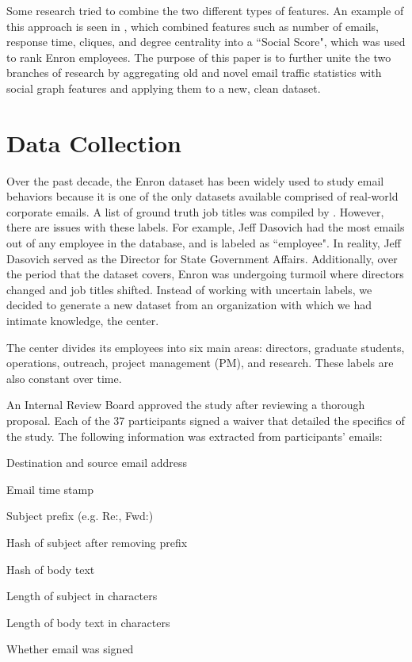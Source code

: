 \documentclass{article}
\begin{document}
\par
Some research tried to combine the two different types of features.  An example of this approach is seen in \cite{rowe_automated_2007}, which combined features such as number of emails, response time, cliques, and degree centrality into a ``Social Score", which was used to rank Enron employees.  The purpose of this paper is to further unite the two branches of research by aggregating old and novel email traffic statistics with social graph features and applying them to a new, clean dataset.

\section{Data Collection} \label{Data Collection}
Over the past decade, the Enron dataset has been widely used to study email behaviors because it is one of the only datasets available comprised of real-world corporate emails.  A list of ground truth job titles was compiled by \cite{shetty_status_2004}.  However, there are issues with these labels.  For example, Jeff Dasovich had the most emails out of any employee in the database, and is labeled as ``employee".  In reality, Jeff Dasovich served as the Director for State Government Affairs. Additionally, over the period that the dataset covers, Enron was undergoing turmoil where directors changed and job titles shifted.  Instead of working with uncertain labels, we decided to generate a new dataset from an organization with which we had intimate knowledge, the center.  
\par
The center divides its employees into six main areas: directors, graduate students, operations, outreach, project management (PM), and research.  These labels are also constant over time.
\par 
An Internal Review Board approved the study after reviewing a thorough proposal.  Each of the 37 participants signed a waiver that detailed the specifics of the study.   The following information was extracted from participants' emails:  
\begin{compactitem}
\item Destination and source email address
\item Email time stamp
\item Subject prefix (e.g. Re:, Fwd:)
\item Hash of subject after removing prefix
\item Hash of body text
\item Length of subject in characters
\item Length of body text in characters
\item Whether email was signed
\end{compactitem}
\end{document}
